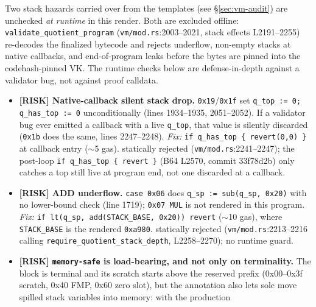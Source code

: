 Two stack hazards carried over from the templates (see
\S\ref{sec:vm-audit}) are unchecked \emph{at runtime} in this render.
Both are excluded offline: \texttt{validate\_\allowbreak{}quotient\_\allowbreak{}program}
(\texttt{vm/mod.rs}:2003--2021, stack effects L2191--2255) re-decodes the
finalized bytecode and rejects underflow, non-empty stacks at native
callbacks, and end-of-program leaks before the bytes are pinned into the
codehash-pinned VK. The runtime checks below are defense-in-depth against
a validator bug, not against proof calldata.

\begin{itemize}
  \item \textcolor{rustorange}{\textbf{[RISK] Native-callback silent
        stack drop.}} \texttt{0x19}/\texttt{0x1f} set
        \texttt{q\_\allowbreak{}top := 0; q\_\allowbreak{}has\_\allowbreak{}top := 0} unconditionally
        (lines 1934--1935, 2051--2052). If a validator bug ever emitted
        a callback with a live \texttt{q\_top}, that value is silently
        discarded (\texttt{0x1b} does the same, lines 2247--2248).
        \emph{Fix:} \texttt{if q\_\allowbreak{}has\_\allowbreak{}top \{ revert(0,0) \}}
        at callback entry ($\sim$5 gas).
         statically rejected (\texttt{vm/mod.rs}:2241--2247);
        the post-loop \texttt{if q\_\allowbreak{}has\_\allowbreak{}top \{ revert \}} (B64 L2570,
        commit 33f78d2b) only catches a top still live at program end,
        not one discarded at a callback.
  \item \textcolor{rustorange}{\textbf{[RISK] ADD underflow.}}
        \texttt{case 0x06} does \texttt{q\_\allowbreak{}sp := sub(q\_\allowbreak{}sp, 0x20)} with
        no lower-bound check (line 1719); \texttt{0x07 MUL} is not
        rendered in this program. \emph{Fix:}
        \texttt{if lt(q\_\allowbreak{}sp, add(STACK\_\allowbreak{}BASE, 0x20)) revert}
        ($\sim$10 gas), where \texttt{STACK\_BASE} is the rendered
        \texttt{0xa980}.
         statically rejected
        (\texttt{vm/mod.rs}:2213--2216 calling \texttt{require\_\allowbreak{}quotient\_\allowbreak{}stack\_\allowbreak{}depth}, L2258--2270);
        no runtime guard.
  \item \textcolor{rustorange}{\textbf{[RISK] \texttt{memory-safe} is
        load-bearing, and not only on terminality.}} The block is terminal
        and its scratch starts above the reserved prefix (0x00--0x3f
        scratch, 0x40 FMP, 0x60 zero slot), but the annotation also lets
        solc move spilled stack variables into memory: with the production

\end{itemize}
